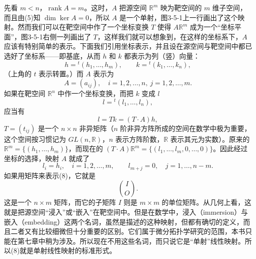 先看 $m<n$，$\operatorname{rank}A=m$。这时，$A$ 把源空间 $\mathbb R^m$ 映为靶空间的 $m$ 维子空间，而且由(5)知 $\dim\ker A=0$，所以 $A$ 是一个单射，图3-5-1上一行画出了这个映射。然而我们可以在靶空间中作了一个坐标变换 $T$ 使得 $A\mathbb R^m$ 成为一个“坐标平面”，图3-5-1右侧一列画出了 $T$，这样我们就可以想象到，在这样的坐标系下，$A$ 应该有特别简单的表示。下面我们引用坐标表示，并且设在源空间与靶空间中都已选好了坐标系——即基底，从而 $h$ 和 $k$ 都表示为列（竖）向量：
\[
 h={}^{t}(h_1,\ldots,h_m),\qquad
 k={}^{t}(k_1,\ldots,k_n),
\]
（上角的 $t$ 表示转置。）而 $A$ 表示为
\[
 A=(a_{ij}),\quad i=1,2,\ldots,n,\ j=1,2,\ldots,m.
\]
如果在靶空间 $\mathbb R^n$ 中作一个坐标变换，而把 $k$ 变成 $l$
\[
 l={}^{t}(l_1,\ldots,l_n),
\]
应当有
\[
 l=Tk=(T\cdot A)h,
\]
$T=(t_{ij})$ 是一个 $n\times n$ 非异矩阵（$n$ 阶非异方阵所成的空间在数学中极为重要，这个空间按习惯记为 $GL(n,\mathbb R)$，$n$ 表示方阵阶数，$\mathbb R$ 表示其元为实数）。原来的 $\mathbb R^m=\{(h_1,\ldots,h_m)\}$，而现在的 $(T\cdot A)\mathbb R^m=\{(l_1,\ldots,l_m,0,\ldots,0)\}$。因此经过坐标的选择，映射 $A$ 就成了
\begin{equation}
 l_i=h_i,\quad i=1,2,\ldots,m,
 \qquad
 l_{m+j}=0,\quad j=1,\ldots,n-m.
 \tag{8}
\end{equation}
如果用矩阵来表示(8)，它就是
\begin{equation}
 \binom{I}{O}.
 \tag{9}
\end{equation}
这是一个 $n\times m$ 矩阵，而它的子矩阵 $I$ 则是 $m\times m$ 的单位矩阵。从几何上看，这就是把源空间“浸入”或“嵌入”在靶空间中。但是在数学中，浸入（immersion）与嵌入（embedding）这两个名词，虽然是描述的这种映射，但都有确切的定义，而且二者又有比较细微但十分重要的区别。它们属于微分拓扑学研究的范围，本书只能在第七章中稍为涉及。所以现在不用这些名词，而只说它是“单射”线性映射。所以(8)就是单射线性映射的标准形式。

